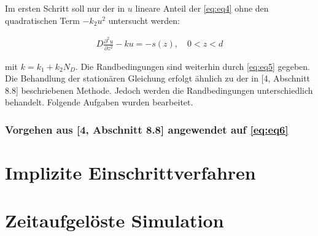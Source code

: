 \documentclass[
	pagesize,
	fontsize=12pt,
	paper=a4,
	oneside,
   reqno
]{scrartcl}
\begin{document}
Im ersten Schritt soll nur der in $u$ lineare Anteil der \autoref{eq:eq4} ohne den quadratischen Term $-k_2u^2$ untersucht werden:

\begin{align}
   \label{eq:eq6}
   D\frac{\partial^2 u}{\partial z^2} - ku = -s(z), \quad 0 < z < d
\end{align}

mit $k = k_1 + k_2N_D$. Die Randbedingungen sind weiterhin durch \autoref{eq:eq5} gegeben. \\

Die Behandlung der stationären Gleichung erfolgt ähnlich zu der in [4, Abschnitt 8.8] beschriebenen Methode. Jedoch werden die Randbedingungen unterschiedlich behandelt. Folgende Aufgaben wurden bearbeitet.

\subsubsection{Vorgehen aus [4, Abschnitt 8.8] angewendet auf \autoref{eq:eq6}}



\clearpage

\section{Implizite Einschrittverfahren} \label{sec:ImpliziteEinschrittverfahren}

\clearpage

\section{Zeitaufgelöste Simulation} \label{sec:ZeitaufgeloesteSimulation}

\clearpage

\newpage
\newcount\Quellennummer
{}

\renewcommand\refname{Literaturverzeichnis}
\end{document}
